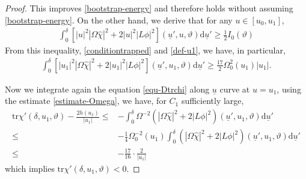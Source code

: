 \documentclass[11pt,reqno]{amsart}
\theoremstyle{definition}
\numberwithin{equation}{section}
\newcommand{\D}{\mathrm{d}}
\newcommand{\tr}{\mathrm{tr}}
\def\chih{\widehat{\chi}}
\def\tr{\mathrm{tr}}
\def\ub{\underline{u}}
\begin{document}
\begin{proof}
This improves \eqref{bootstrap-energy} and therefore holds without assuming \eqref{bootstrap-energy}. On the other hand, we derive that for any $u\in[u_0,u_1]$,
\begin{align*}
\int_0^\delta[|u|^2|\Omega\chih|^2+2|u|^2|L\phi|^2](\ub',u,\vartheta)\D\ub'\ge\frac{1}{2}I_0(\vartheta)
\end{align*}
From this inequality, \eqref{conditiontrapped} and \eqref{def-u1}, we have, in particular,
\begin{align}\label{conditiontrapped3}
\int_0^\delta[|u_1|^2|\Omega\chih|^2+2|u_1|^2|L\phi|^2](\ub',u_1,\vartheta)\D\ub'\ge\frac{17}{2}\Omega_0^2(u_1)|u_1|.
\end{align}

Now we integrate again the equation \eqref{equ-Dtrchi} along $\ub$ curve at $u=u_1$, using the estimate \eqref{estimate-Omega}, we have, for $C_1$ sufficiently large,
\begin{align*}
\tr\chi'(\delta,u_1,\vartheta)-\frac{2h(u_1)}{|u_1|}\le&-\int_0^{\delta}\Omega^{-2}(|\Omega\chih|^2+2|L\phi|^2)(\ub',u_1,\vartheta)\D\ub'\\
\le&-\frac{1}{4}\Omega_0^{-2}(u_1)\int_0^{\delta}(|\Omega\chih|^2+2|L\phi|^2)(\ub',u_1,\vartheta)\D\ub'\\
\le&-\frac{17}{16}\cdot\frac{2}{|u_1|}\end{align*}
which implies $\tr\chi'(\delta,u_1,\vartheta)<0$.



\end{proof}
\end{document}
